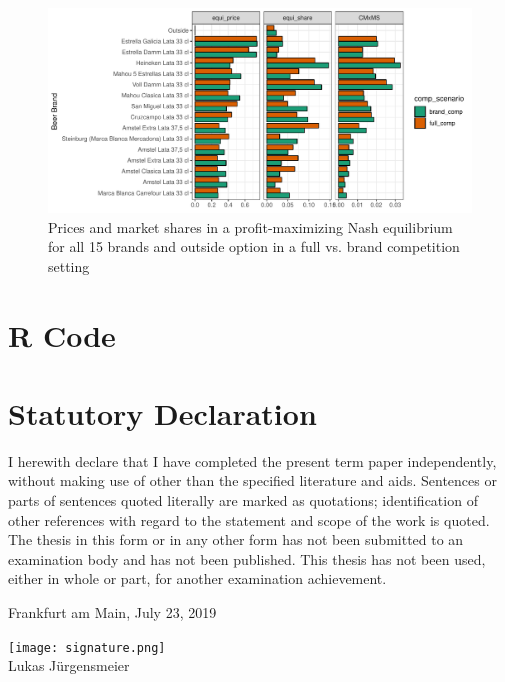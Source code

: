 \documentclass[12pt,a4paper]{article}
\begin{document}
\begin{figure}[ht]
	\centering
  \includegraphics[scale = 0.7]{figures/bar_price_share_full_brand_15.pdf}
	\caption{Prices and market shares in a profit-maximizing Nash equilibrium for all 15 brands and outside option in a full vs. brand competition setting}
	\label{fig_bar_fifteen}
\end{figure}
\clearpage


\section{R Code}






\clearpage



\newpage
\thispagestyle{empty}
\section*{Statutory Declaration}

I herewith declare that I have completed the present term paper independently, without making use of
other than the specified literature and aids. Sentences or parts of sentences quoted literally are
marked as quotations; identification of other references with regard to the statement and scope of
the work is quoted. The thesis in this form or in any other form has not been submitted to an examination body and has not been published.
This thesis has not been used, either in whole or part, for another examination achievement.

\vspace{1cm}

Frankfurt am Main, July 23, 2019

\texttt{[image: signature.png]}\\
Lukas J\"urgensmeier
\end{document}
